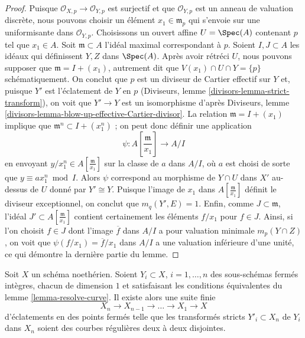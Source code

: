\begin{proof} Puisque $\mathcal{O}_{X, p} \to \mathcal{O}_{Y, p}$ est surjectif et que $\mathcal{O}_{Y, p}$ est un anneau de valuation discrète, nous pouvons choisir un élément $x_1 \in \mathfrak m_p$ qui s'envoie sur une uniformisante dans $\mathcal{O}_{Y, p}$. Choisissons un ouvert affine $U = \Spec(A)$ contenant $p$ tel que $x_1 \in A$. Soit $\mathfrak m \subset A$ l'idéal maximal correspondant à $p$. Soient $I, J \subset A$ les idéaux qui définissent $Y, Z$ dans $\Spec(A)$. Après avoir rétréci $U$, nous pouvons supposer que $\mathfrak m = I + (x_1)$, autrement dit que $V(x_1) \cap U \cap Y = \{p\}$ schématiquement. On conclut que $p$ est un diviseur de Cartier effectif sur $Y$ et, puisque $Y'$ est l'éclatement de $Y$ en $p$ (Diviseurs, lemme \ref{divisors-lemma-strict-transform}), on voit que $Y' \to Y$ est un isomorphisme d'après Diviseurs, lemme \ref{divisors-lemma-blow-up-effective-Cartier-divisor}. La relation $\mathfrak m = I + (x_1)$ implique que $\mathfrak m^n \subset I + (x_1^n)$ ; on peut donc définir une application $$
\psi : A[\textstyle{\frac{\mathfrak m}{x_1}}] \longrightarrow A/I
$$ en envoyant $y/x_1^n \in A[\frac{\mathfrak m}{x_1}]$ sur la classe de $a$ dans $A/I$, où $a$ est choisi de sorte que $y \equiv ax_1^n \bmod I$. Alors $\psi$ correspond au morphisme de $Y \cap U$ dans $X'$ au-dessus de $U$ donné par $Y' \cong Y$. Puisque l'image de $x_1$ dans $A[\frac{\mathfrak m}{x_1}]$ définit le diviseur exceptionnel, on conclut que $m_q(Y', E) = 1$. Enfin, comme $J \subset \mathfrak m$, l'idéal $J' \subset A[\frac{\mathfrak m}{x_1}]$ contient certainement les éléments $f/x_1$ pour $f \in J$. Ainsi, si l'on choisit $f \in J$ dont l'image $\overline{f}$ dans $A/I$ a pour valuation minimale $m_p(Y \cap Z)$, on voit que $\psi(f/x_1) = \overline{f}/x_1$ dans $A/I$ a une valuation inférieure d'une unité, ce qui démontre la dernière partie du lemme. \end{proof}

\begin{lemma} \label{lemma-blowup-curves} Soit $X$ un schéma noethérien. Soient $Y_i \subset X$, $i = 1, \ldots, n$ des sous-schémas fermés intègres, chacun de dimension $1$ et satisfaisant les conditions équivalentes du lemme \ref{lemma-resolve-curve}. Il existe alors une suite finie $$
X_n \to X_{n - 1} \to \ldots \to X_1 \to X
$$ d'éclatements en des points fermés telle que les transformés stricts $Y'_i \subset X_n$ de $Y_i$ dans $X_n$ soient des courbes régulières deux à deux disjointes. \end{lemma}

